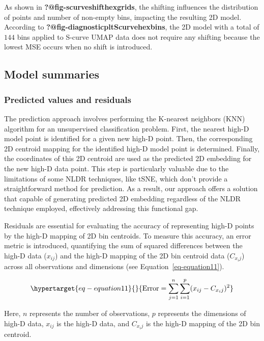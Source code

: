 \documentclass[
  12pt]{article}
\begin{document}
As shown in \textbf{?@fig-scurveshifthexgrids}, the shifting influences
the distribution of points and number of non-empty bins, impacting the
resulting 2D model. According to
\textbf{?@fig-diagnosticpltScurvehexbins}, the 2D model with a total of
\(144\) bins applied to S-curve UMAP data does not require any shifting
because the lowest MSE occurs when no shift is introduced.

\hypertarget{sec-summary}{%
\subsection{Model summaries}\label{sec-summary}}

\hypertarget{predicted-values-and-residuals}{%
\subsubsection{Predicted values and
residuals}\label{predicted-values-and-residuals}}

The prediction approach involves performing the K-nearest neighbors
(KNN) algorithm for an unsupervised classification problem. First, the
nearest high-D model point is identified for a given new high-D point.
Then, the corresponding 2D centroid mapping for the identified high-D
model point is determined. Finally, the coordinates of this 2D centroid
are used as the predicted 2D embedding for the new high-D data point.
This step is particularly valuable due to the limitations of some NLDR
techniques, like tSNE, which don't provide a straightforward method for
prediction. As a result, our approach offers a solution that capable of
generating predicted 2D embedding regardless of the NLDR technique
employed, effectively addressing this functional gap.

Residuals are essential for evaluating the accuracy of representing
high-D points by the high-D mapping of 2D bin centroids. To measure this
accuracy, an error metric is introduced, quantifying the sum of squared
differences between the high-D data (\(x_{ij}\)) and the high-D mapping
of the 2D bin centroid data (\(C_{x_ij}\)) across all observations and
dimensions (see Equation~\ref{eq-equation11}).

\begin{equation}\protect\hypertarget{eq-equation11}{}{
\text{Error} = \sum_{j = 1}^{n}\sum_{i = 1}^{p} (x_{ij} - C_{x_ij})^2
}\label{eq-equation11}\end{equation}

Here, \(n\) represents the number of observations, \(p\) represents the
dimensions of high-D data, \(x_{ij}\) is the high-D data, and
\(C_{x_ij}\) is the high-D mapping of the 2D bin centroid.
\end{document}
